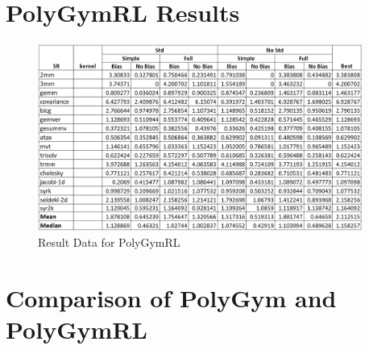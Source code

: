 \documentclass[logo,msc]{infthesis}           %
\begin{document}
\begin{preliminary}
\section{PolyGymRL Results}

\begin{figure}[htbp]
  \centering
  \includegraphics[width=0.95\textwidth]{Images/BenchMarking.png}    
  \caption{Result Data for PolyGymRL}
  \label{fig:BenchMarking}
\end{figure}

\section{Comparison of PolyGym and PolyGymRL}


\end{preliminary}
\end{document}
